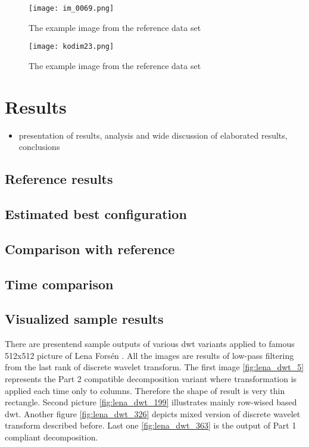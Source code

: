 \begin{figure}
    \centering
    \texttt{[image: im\_0069.png]}
    \caption{The example image from the reference data set \cite{ref_images}}
    \label{fig:example_2}
\end{figure}

\begin{figure}
    \centering
    \texttt{[image: kodim23.png]}
    \caption{The example image from the reference data set \cite{ref_images}}
    \label{fig:example_3}
\end{figure}


\section{Results}

\begin{itemize}
	\item presentation of results, analysis and wide discussion of elaborated results, conclusions
\end{itemize}

\subsection{Reference results}

\subsection{Estimated best configuration}

\subsection{Comparison with reference}

\subsection{Time comparison}

\subsection{Visualized sample results}

There are presentend sample outputs of various dwt variants applied to famous 512x512 picture
of Lena Forsén \cite{lena}. All the images are results of low-pass filtering from the last
rank of discrete wavelet transform. The first image \ref{fig:lena_dwt_5} represents the Part 2
compatible decomposition variant where transformation is applied each time only to columns.
Therefore the shape of result is very thin rectangle. Second picture \ref{fig:lena_dwt_199}
illustrates mainly row-wised based dwt.
Another figure \ref{fig:lena_dwt_326} depicts mixed version of discrete wavelet transform described
before. Last one \ref{fig:lena_dwt_363} is the output of Part 1 compliant decomposition.

